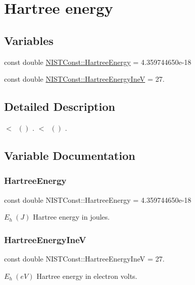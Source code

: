 \hypertarget{group___hartree_energy}{}\section{Hartree energy}
\label{group___hartree_energy}
\subsection*{Variables}
\begin{DoxyCompactItemize}
\item 
const double \hyperlink{group___hartree_energy_gab58dc1c4e59e83d4fb1217778fe9f29b}{N\+I\+S\+T\+Const\+::\+Hartree\+Energy} = 4.\+359744650e-\/18
\item 
const double \hyperlink{group___hartree_energy_ga400eb5b8c9b55b0f601870ba54120364}{N\+I\+S\+T\+Const\+::\+Hartree\+Energy\+IneV} = 27.
\end{DoxyCompactItemize}


\subsection{Detailed Description}
$<$ $ \ ()$ . $<$ $ \ ()$ . 

\subsection{Variable Documentation}
\mbox{\label{group___hartree_energy_gab58dc1c4e59e83d4fb1217778fe9f29b}} 
\subsubsection{\texorpdfstring{Hartree\+Energy}{HartreeEnergy}}
{\footnotesize\ttfamily const double N\+I\+S\+T\+Const\+::\+Hartree\+Energy = 4.\+359744650e-\/18}

$E_h \ (J)$ Hartree energy in joules. \mbox{\label{group___hartree_energy_ga400eb5b8c9b55b0f601870ba54120364}} 
\subsubsection{\texorpdfstring{Hartree\+Energy\+IneV}{HartreeEnergyIneV}}
{\footnotesize\ttfamily const double N\+I\+S\+T\+Const\+::\+Hartree\+Energy\+IneV = 27.}

$E_h \ (eV)$ Hartree energy in electron volts. 